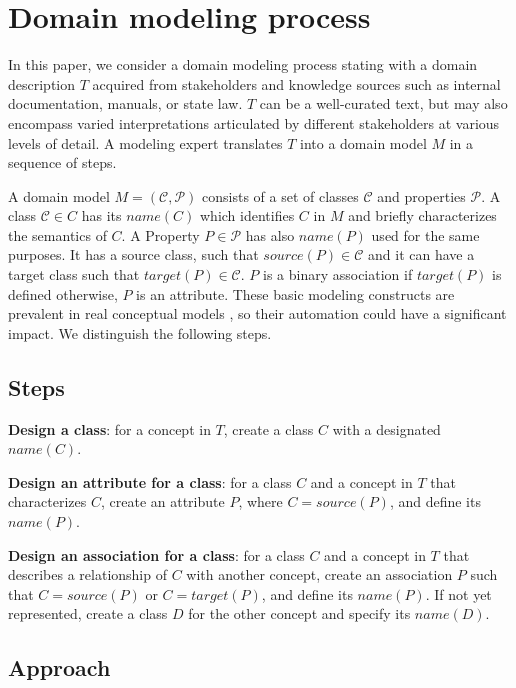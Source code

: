 \chapter{Domain modeling process}

In this paper, we consider a domain modeling process stating with a domain description $T$ acquired from stakeholders and knowledge sources such as internal documentation, manuals, or state law. $T$ can be a well-curated text, but may also encompass varied interpretations articulated by different stakeholders at various levels of detail. A modeling expert translates $T$ into a domain model $M$ in a sequence of steps.

A domain model $M = (\mathcal{C}, \mathcal{P})$ consists of a set of classes $\mathcal{C}$ and properties $\mathcal{P}$. A class $\mathcal{C} \in C$ has its $name(C)$ which identifies $C$ in $M$ and briefly characterizes the semantics of $C$. A Property $P \in \mathcal{P}$ has also $name(P)$ used for the same purposes. It has a source class, such that $source(P) \in \mathcal{C}$ and it can have a target class such that $target(P) \in \mathcal{C}$. $P$ is a binary association if $target(P)$ is defined otherwise, $P$ is an attribute. These basic modeling constructs are prevalent in real conceptual models \cite{Keet2015}, so their automation could have a significant impact. We distinguish the following steps.


\section{Steps}

\textbf{Design a class}:
for a concept in $T$, create a class $C$ with a designated $name(C)$.

\textbf{Design an attribute for a class}:
for a class $C$ and a concept in $T$ that characterizes $C$, create an attribute $P$, where $C = source(P)$, and define its $name(P)$.

\textbf{Design an association for a class}:
for a class $C$ and a concept in $T$ that describes a relationship of $C$ with another concept, create an association $P$ such that $C = source(P)$ or $C = target(P)$, and define its $name(P)$. If not yet represented, create a class $D$ for the other concept and specify its $name(D)$.


\section{Approach}

